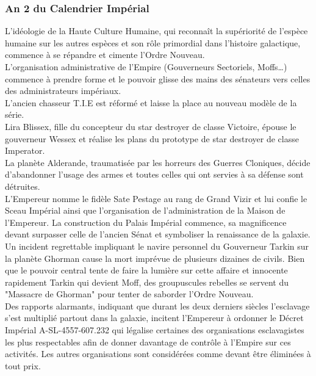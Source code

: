 \documentclass[twoside]{article}
\begin{document}
\subsubsection*{An 2 du Calendrier Impérial}
L'idéologie de la Haute Culture Humaine, qui reconna\^{i}t la supériorité de l'espèce humaine sur les autres espèces et son rôle primordial dans l'histoire galactique, commence à se répandre et cimente l'Ordre Nouveau.\\

L'organisation administrative de l'Empire (Gouverneurs Sectoriels, Moffs\ldots) commence à prendre forme et le pouvoir glisse des mains des sénateurs vers celles des administrateurs impériaux.\\

L'ancien chasseur T.I.E est réformé et laisse la place au nouveau modèle de la série.\\

Lira Blissex, fille du concepteur du star destroyer de classe Victoire, épouse le gouverneur Wessex et réalise les plans du prototype de star destroyer de classe Imperator.\\

La planète Alderande, traumatisée par les horreurs des Guerres Cloniques, décide d'abandonner l'usage des armes et toutes celles qui ont servies à sa défense sont détruites.\\

L'Empereur nomme le fidèle Sate Pestage au rang de Grand Vizir et lui confie le Sceau Impérial ainsi que l'organisation de l'administration de la Maison de l'Empereur. La construction du Palais Impérial commence, sa magnificence devant surpasser celle de l'ancien Sénat et symboliser la renaissance de la galaxie. Un incident regrettable impliquant le navire personnel du Gouverneur Tarkin sur la planète Ghorman cause la mort imprévue de plusieurs dizaines de civils. Bien que le pouvoir central tente de faire la lumière sur cette affaire et innocente rapidement Tarkin qui devient Moff, des groupuscules rebelles se servent du "Massacre de Ghorman" pour tenter de saborder l'Ordre Nouveau.\\

Des rapports alarmants, indiquant que durant les deux derniers siècles l'esclavage s'est multiplié partout dans la galaxie, incitent l'Empereur à ordonner le Décret Impérial A-SL-4557-607.232 qui légalise certaines des organisations esclavagistes les plus respectables afin de donner davantage de contrôle à l'Empire sur ces activités. Les autres organisations sont considérées comme devant être éliminées à tout prix.\\
\end{document}
